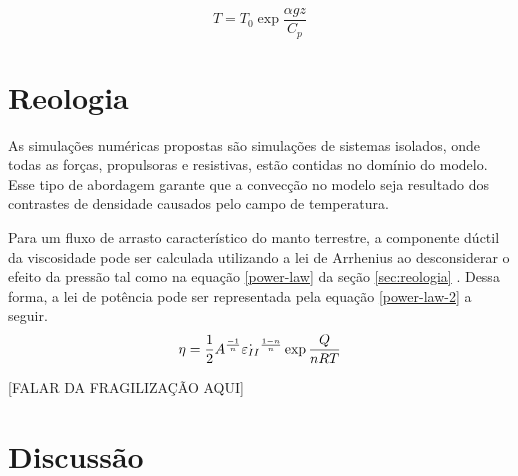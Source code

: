 \begin{equation}{}\label{eq:adiabatic-temp}
  T = T_0 \exp{\frac{\alpha g z}{C_p}}
\end{equation}


\section{Reologia}

As simulações numéricas propostas são simulações de sistemas isolados, onde todas as forças, propulsoras e resistivas, estão contidas no domínio do modelo. Esse tipo de abordagem garante que a convecção no modelo seja resultado dos contrastes de densidade causados pelo campo de temperatura.

Para um fluxo de arrasto característico do manto terrestre, a componente dúctil da viscosidade pode ser calculada utilizando a lei de Arrhenius ao desconsiderar o efeito da pressão tal como na equação \ref{power-law} da seção \ref{sec:reologia} \citep{vankeken2008community}. Dessa forma, a lei de potência pode ser representada pela equação \ref{power-law-2} a seguir.
\begin{equation}{\label{power-law-2}}
	\eta = \frac{1}{2} A^{\frac{-1}{n}} \dot{\varepsilon_{II}}^{\frac{1-n}{n}} \exp{\frac{Q}{nRT}} 
\end{equation}


[FALAR DA FRAGILIZAÇÃO AQUI]

\section{Discussão}

